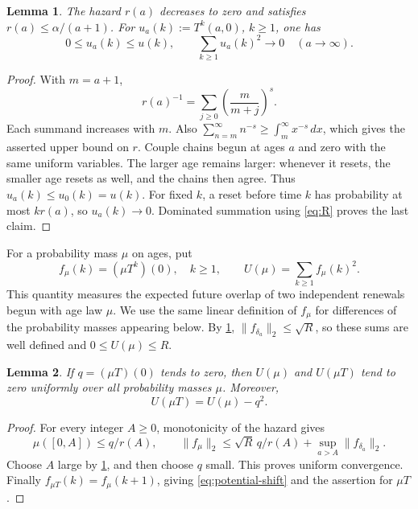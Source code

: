 \documentclass[11pt]{article}
\newtheorem{lemma}[lemma]{Lemma}
\theoremstyle{remark}
\numberwithin{equation}{section}
\begin{document}
\begin{lemma}\label{lem:age}
The hazard $r(a)$ decreases to zero and satisfies $r(a)\le\alpha/(a+1)$.
For $u_a(k):=T^k(a,0)$, $k\ge1$, one has
\[
 0\le u_a(k)\le u(k),\qquad
 \sum_{k\ge1}u_a(k)^2\longrightarrow0\quad(a\to\infty).
\]
\end{lemma}
\begin{proof}
With $m=a+1$,
\[
 r(a)^{-1}=\sum_{j\ge0}\left(\frac{m}{m+j}\right)^s.
\]
Each summand increases with $m$. Also
$\sum_{n=m}^\infty n^{-s}\ge\int_m^\infty x^{-s}\,dx$,
which gives the asserted upper bound on $r$.
Couple chains begun at ages $a$ and zero with the same uniform variables.
The larger age remains larger: whenever it resets, the smaller age resets
as well, and the chains then agree. Thus $u_a(k)\le u_0(k)=u(k)$.
For fixed $k$, a reset before time $k$ has probability at most $kr(a)$,
so $u_a(k)\to0$. Dominated summation using \eqref{eq:R} proves the last claim.
\end{proof}

For a probability mass $\mu$ on ages, put
\begin{equation}\label{eq:potential}
 f_\mu(k)=(\mu T^k)(0),\quad k\ge1,\qquad
 U(\mu)=\sum_{k\ge1}f_\mu(k)^2.
\end{equation}
This quantity measures the expected future overlap of two independent
renewals begun with age law $\mu$. We use the same linear definition of
$f_\mu$ for differences of the probability masses appearing below.
By \cref{lem:age}, $\|f_{\delta_a}\|_2\le\sqrt R$, so these sums are
well defined and $0\le U(\mu)\le R$.

\begin{lemma}\label{lem:compactness}
If $q=(\mu T)(0)$ tends to zero, then $U(\mu)$ and $U(\mu T)$ tend
to zero uniformly over all probability masses $\mu$. Moreover,
\begin{equation}\label{eq:potential-shift}
 U(\mu T)=U(\mu)-q^2.
\end{equation}
\end{lemma}
\begin{proof}
For every integer $A\ge0$, monotonicity of the hazard gives
\[
 \mu([0,A])\le q/r(A),\qquad
 \|f_\mu\|_2\le\sqrt R\,q/r(A)
                  +\sup_{a>A}\|f_{\delta_a}\|_2.
\]
Choose $A$ large by \cref{lem:age}, and then choose $q$ small. This proves
uniform convergence. Finally $f_{\mu T}(k)=f_\mu(k+1)$, giving
\eqref{eq:potential-shift} and the assertion for $\mu T$.
\end{proof}
\end{document}
